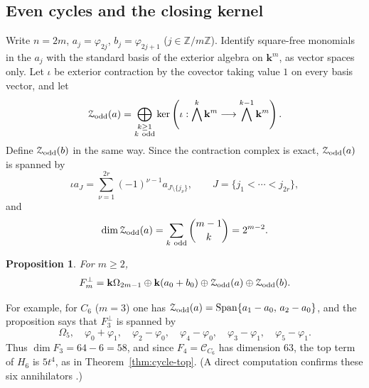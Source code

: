 \documentclass[reqno]{article}
\theoremstyle{plain} %
\newtheorem{proposition}[theorem]{Proposition}
\theoremstyle{definition}
\theoremstyle{remark}
\DeclareMathOperator{\Span}{Span}
\newcommand{\Z}{{\mathbb{Z}}}
\newcommand{\K} {\mathbf{k}}
\newcommand {\CC}{\mathscr{C}}
\numberwithin{equation}{section}
\begin{document}
\subsection{Even cycles and the closing kernel}
\label{sec:even-cycles}

Write $n=2m$, $a_j=\varphi_{2j}$, $b_j=\varphi_{2j+1}$
($j\in\Z/m\Z$). Identify square-free monomials in the $a_j$ with the
standard basis of the exterior algebra on $\K^m$, as vector spaces
only. Let $\iota$ be exterior contraction by the covector taking
value $1$ on every basis vector, and let
\[
\mathcal Z_{\rm odd}(a)=
\bigoplus_{\substack{k\ge1\\ k\ {\rm odd}}}
\ker\left(\iota:\bigwedge^k\K^m\longrightarrow
                         \bigwedge^{k-1}\K^m\right).
\]
Define $\mathcal Z_{\rm odd}(b)$ in the same way. Since the contraction
complex is exact, $\mathcal Z_{\rm odd}(a)$ is spanned by
\begin{equation}\label{eq:alternating-boundaries}
\iota a_J=
\sum_{\nu=1}^{2r}(-1)^{\nu-1}a_{J\setminus\{j_\nu\}},
\qquad J=\{j_1<\cdots<j_{2r}\},
\end{equation}
and
\begin{equation}\label{eq:odd-boundary-dimension}
\dim\mathcal Z_{\rm odd}(a)
=\sum_{k\ {\rm odd}}\binom{m-1}{k}=2^{m-2}.
\end{equation}

\begin{proposition}\label{prop:even-cycle-annihilator}
For $m\ge2$,
\begin{equation}\label{eq:even-cycle-annihilator}
F_m^\perp=
\K\Omega_{2m-1}\oplus\K(a_0+b_0)
\oplus\mathcal Z_{\rm odd}(a)\oplus\mathcal Z_{\rm odd}(b).
\end{equation}
\end{proposition}

For example, for $C_6$ ($m=3$) one has
$\mathcal Z_{\rm odd}(a)=\Span\{a_1-a_0,\,a_2-a_0\}$, and the
proposition says that $F_3^\perp$ is spanned by
\[
\Omega_5,\quad \varphi_0+\varphi_1,\quad
\varphi_2-\varphi_0,\quad\varphi_4-\varphi_0,\quad
\varphi_3-\varphi_1,\quad\varphi_5-\varphi_1 .
\]
Thus $\dim F_3=64-6=58$, and since $F_4=\CC_{C_6}$ has dimension $63$,
the top term of $H_6$ is $5t^4$, as in Theorem~\ref{thm:cycle-top}.
(A direct computation confirms these six annihilators
\cite[\texttt{cycles/annihilators.py}]{Cert}.)
\end{document}
